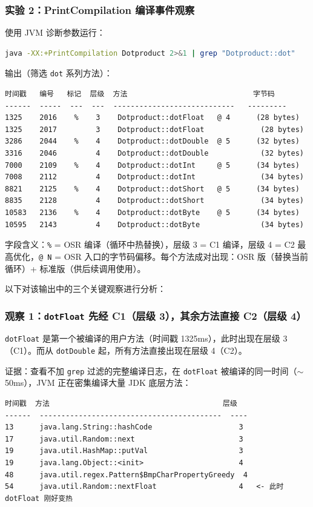 \documentclass[12pt,a4paper]{article}
\begin{document}
\subsubsection{实验 2：PrintCompilation 编译事件观察}

使用 JVM 诊断参数运行：

\begin{lstlisting}[language=bash]
java -XX:+PrintCompilation Dotproduct 2>&1 | grep "Dotproduct::dot"
\end{lstlisting}

输出（筛选 \texttt{dot} 系列方法）：

\begin{lstlisting}
时间戳   编号   标记  层级  方法                             字节码
------  -----  ---  ---  ----------------------------   ---------
1325    2016    %    3    Dotproduct::dotFloat   @ 4      (28 bytes)
1325    2017         3    Dotproduct::dotFloat             (28 bytes)
3286    2044    %    4    Dotproduct::dotDouble  @ 5      (32 bytes)
3316    2046         4    Dotproduct::dotDouble            (32 bytes)
7000    2109    %    4    Dotproduct::dotInt     @ 5      (34 bytes)
7008    2112         4    Dotproduct::dotInt               (34 bytes)
8821    2125    %    4    Dotproduct::dotShort   @ 5      (34 bytes)
8835    2128         4    Dotproduct::dotShort             (34 bytes)
10583   2136    %    4    Dotproduct::dotByte    @ 5      (34 bytes)
10595   2143         4    Dotproduct::dotByte              (34 bytes)
\end{lstlisting}

字段含义：\texttt{\%} = OSR 编译（循环中热替换），层级 3 = C1 编译，层级 4 = C2 最高优化，\texttt{@ N} = OSR 入口的字节码偏移。每个方法成对出现：OSR 版（替换当前循环）+ 标准版（供后续调用使用）。

以下对该输出中的三个关键观察进行分析：

\subsubsection*{观察 1：\texttt{dotFloat} 先经 C1（层级 3），其余方法直接 C2（层级 4）}

\texttt{dotFloat} 是第一个被编译的用户方法（时间戳 1325ms），此时出现在层级 3（C1）。而从 \texttt{dotDouble} 起，所有方法直接出现在层级 4（C2）。

证据：查看不加 \texttt{grep} 过滤的完整编译日志，在 \texttt{dotFloat} 被编译的同一时间（$\sim$50ms），JVM 正在密集编译大量 JDK 底层方法：

\begin{lstlisting}
时间戳  方法                                        层级
------  ------------------------------------------  ----
13      java.lang.String::hashCode                    3
17      java.util.Random::next                        3
19      java.util.HashMap::putVal                     3
19      java.lang.Object::<init>                      4
48      java.util.regex.Pattern$BmpCharPropertyGreedy  4
54      java.util.Random::nextFloat                   4   <- 此时 dotFloat 刚好变热
\end{lstlisting}
\end{document}
